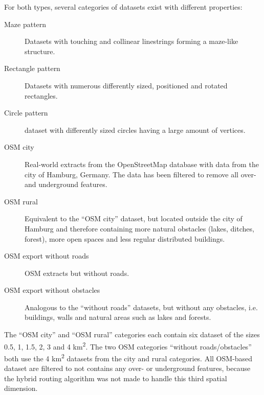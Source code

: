 			For both types, several categories of datasets exist with different properties:
			\begin{description}
				\item[Maze pattern] Datasets with touching and collinear linestrings forming a maze-like structure.
				\item[Rectangle pattern] Datasets with numerous differently sized, positioned and rotated rectangles.
				\item[Circle pattern] dataset with differently sized circles having a large amount of vertices.
				\item[OSM city] Real-world extracts from the OpenStreetMap database with data from the city of Hamburg, Germany. The data has been filtered to remove all over- and underground features.
				\item[OSM rural] Equivalent to the \enquote{OSM city} dataset, but located outside the city of Hamburg and therefore containing more natural obstacles (lakes, ditches, forest), more open spaces and less regular distributed buildings.
				\item[OSM export without roads] OSM extracts but without roads.
				\item[OSM export without obstacles] Analogous to the \enquote{without roads} datasets, but without any obstacles, i.e. buildings, walls and natural areas such as lakes and forests.
			\end{description}
			The \enquote{OSM city} and \enquote{OSM rural} categories each contain six dataset of the sizes 0.5, 1, 1.5, 2, 3 and 4 km\textsuperscript{2}.
			The two OSM categories \enquote{without roads/obstacles} both use the 4 km\textsuperscript{2} datasets from the city and rural categories.
			All OSM-based dataset are filtered to not contains any over- or underground features, because the hybrid routing algorithm was not made to handle this third spatial dimension.
			
